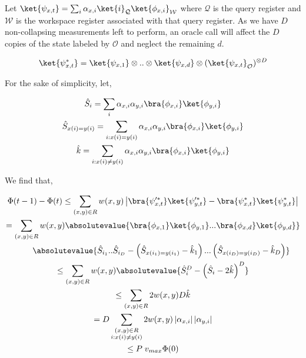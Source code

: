 \documentclass[10pt,a4paper]{article}
\begin{document}
Let $\ket{\psi_{x,t}}=\sum_{i}\alpha_{x,i}\ket{i}_{\mathcal{Q}}\ket{\phi_{x,i}}_{\mathcal{W}}$ where $\mathcal{Q}$ is the query register and $\mathcal{W}$ is the workspace register associated with that query register. As we have $D$ non-collapsing measurements left to perform, an oracle call will affect the $D$ copies of the state labeled by $\mathcal{O}$ and neglect the remaining $d$.\par


\[\begin{gathered}
\displaystyle\ket{\psi_{x,t}^{*}}=\ket{\psi_{x,1}}\otimes..\otimes\ket{\psi_{x,d}}\otimes(\ket{\psi_{x,t}}_{\mathcal{O}})^{\otimes D}
\end{gathered}\]




For the sake of simplicity, let,\par


\[\begin{gathered}
\displaystyle\hat{S}_{i} \displaystyle=\sum_{i}\alpha_{x,i}\alpha_{y,i}\bra{\phi_{x,i}}\ket{\phi_{y,i}} \\
\displaystyle\hat{S}_{x(i)=y(i)} \displaystyle=\sum_{i:x(i)=y(i)}\alpha_{x,i}\alpha_{y,i}\bra{\phi_{x,i}}\ket{\phi_{y,i}} \\
\displaystyle\hat{k} \displaystyle=\sum_{i:x(i)\neq y(i)}\alpha_{x,i}\alpha_{y,i}\bra{\phi_{x,i}}\ket{\phi_{y,i}}
\end{gathered}\]


We find that,\par


\[\begin{gathered}
\displaystyle\Phi(t-1)-\Phi(t)\leq \displaystyle\sum_{(x,y)\in R}w(x,y)\left|\bra{\psi_{x,t}^{\prime*}}\ket{\psi_{y,t}^{\prime*}}-\bra{\psi_{x,t}^{*}}\ket{\psi_{y,t}^{*}}\right| \\
\displaystyle= \displaystyle\sum_{(x,y)\in R}w(x,y)\absolutevalue{\bra{\phi_{x,1}}\ket{\phi_{y,1}}...\bra{\phi_{x,d}}\ket{\phi_{y,d}}} \\
\displaystyle\qquad\absolutevalue{\hat{S}_{i_{1}}..\hat{S}_{i_{D}}-\left(\hat{S}_{x(i_{1})=y(i_{1})}-\hat{k}_{1}\right)...\left(\hat{S}_{x(i_{D})=y(i_{D})}-\hat{k}_{D}\right)} \\
\displaystyle\leq \displaystyle\sum_{(x,y)\in R}w(x,y)\absolutevalue{\hat{S}_{i}^{D}-\left(\hat{S}_{i}-2\hat{k}\right)^{D}} \\
\displaystyle\leq \displaystyle\sum_{(x,y)\in R}2w(x,y)D\hat{k} \\
\displaystyle= \displaystyle D\sum_{\begin{subarray}{c}(x,y)\in R\\
i:x(i)\neq y(i)\end{subarray}}2w(x,y)\left|\alpha_{x,i}\right|\left|\alpha_{y,i}\right| \\
\displaystyle\leq \displaystyle P\;v_{max}\Phi(0)
\end{gathered}\]
\end{document}
